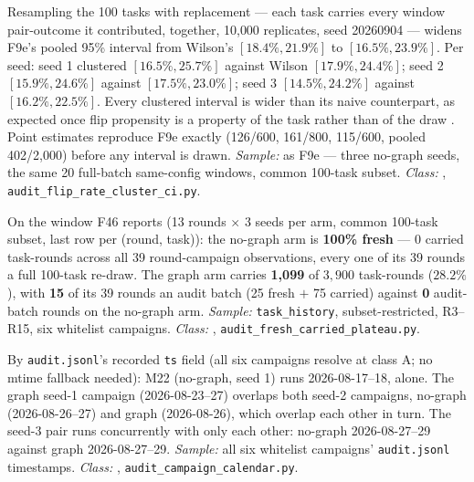 \begin{description}[leftmargin=0pt,labelindent=0pt,labelsep=0pt,style=nextline,font=\normalfont,itemsep=6pt]
\item[\textbf{F57}\quad Task-clustered bootstrap interval on the same-config
      flip rate.]
Resampling the 100 tasks with replacement --- each task carries every
window pair-outcome it contributed, together, 10{,}000 replicates, seed
20260904 --- widens F9e's pooled 95\% interval from Wilson's $[18.4\%,
21.9\%]$ to $[16.5\%, 23.9\%]$. Per seed: seed 1 clustered $[16.5\%,
25.7\%]$ against Wilson $[17.9\%, 24.4\%]$; seed 2 $[15.9\%, 24.6\%]$
against $[17.5\%, 23.0\%]$; seed 3 $[14.5\%, 24.2\%]$ against $[16.2\%,
22.5\%]$. Every clustered interval is wider than its naive counterpart, as
expected once flip propensity is a property of the task rather than of the
draw . Point estimates reproduce F9e exactly (126/600, 161/800,
115/600, pooled 402/2{,}000) before any interval is drawn. \emph{Sample:}
as F9e --- three no-graph seeds, the same 20 full-batch same-config
windows, common 100-task subset. \emph{Class:} ,
\texttt{audit\_flip\_rate\_cluster\_ci.py}.

\item[\textbf{F58}\quad Fresh vs carried composition of the R3--R15
      plateau.]
On the window F46 reports (13 rounds $\times$ 3 seeds per arm, common
100-task subset, last row per (round, task)): the no-graph arm is
\textbf{100\% fresh} --- 0 carried task-rounds across all 39
round-campaign observations, every one of its 39 rounds a full 100-task
re-draw. The graph arm carries \textbf{1{,}099} of $3{,}900$ task-rounds
($28.2\%$), with \textbf{15} of its 39 rounds an audit batch (25 fresh $+$
75 carried) against \textbf{0} audit-batch rounds on the no-graph arm.
\emph{Sample:} \texttt{task\_history}, subset-restricted, R3--R15, six
whitelist campaigns. \emph{Class:} ,
\texttt{audit\_fresh\_carried\_plateau.py}.

\item[\textbf{F59}\quad Campaign calendar: order and overlap.]
By \texttt{audit.jsonl}'s recorded \texttt{ts} field (all six campaigns
resolve at class A; no mtime fallback needed): M22 (no-graph, seed 1) runs
2026-08-17--18, alone. The graph seed-1 campaign (2026-08-23--27) overlaps
both seed-2 campaigns, no-graph (2026-08-26--27) and graph (2026-08-26),
which overlap each other in turn. The seed-3 pair runs concurrently with
only each other: no-graph 2026-08-27--29 against graph 2026-08-27--29.
\emph{Sample:} all six whitelist campaigns' \texttt{audit.jsonl}
timestamps. \emph{Class:} , \texttt{audit\_campaign\_calendar.py}.


\end{description}
